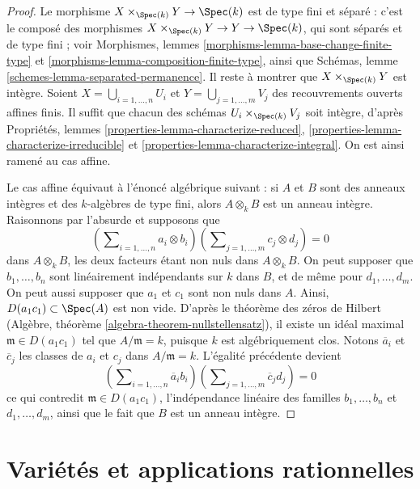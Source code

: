 \begin{proof}
Le morphisme $X \times_{\Spec(k)} Y \to \Spec(k)$ est de type
fini et séparé : c'est le composé des morphismes
$X \times_{\Spec(k)} Y \to Y \to \Spec(k)$, qui sont séparés
et de type fini ; voir Morphismes, lemmes
\ref{morphisms-lemma-base-change-finite-type} et
\ref{morphisms-lemma-composition-finite-type}, ainsi que
Schémas, lemme \ref{schemes-lemma-separated-permanence}.
Il reste à montrer que $X \times_{\Spec(k)} Y$ est intègre.
Soient $X = \bigcup_{i = 1, \ldots, n} U_i$ et
$Y = \bigcup_{j = 1, \ldots, m} V_j$ des recouvrements
ouverts affines finis. Il suffit que chacun des schémas
$U_i \times_{\Spec(k)} V_j$ soit intègre, d'après
Propriétés, lemmes \ref{properties-lemma-characterize-reduced},
\ref{properties-lemma-characterize-irreducible} et
\ref{properties-lemma-characterize-integral}.
On est ainsi ramené au cas affine.

\medskip\noindent
Le cas affine équivaut à l'énoncé algébrique suivant : si $A$ et
$B$ sont des anneaux intègres et des $k$-algèbres de type fini, alors $A
\otimes_k B$ est un anneau intègre. Raisonnons par l'absurde et supposons que
$$
(\sum\nolimits_{i = 1, \ldots, n} a_i \otimes b_i)
(\sum\nolimits_{j = 1, \ldots, m} c_j \otimes d_j) = 0
$$
dans $A \otimes_k B$, les deux facteurs étant non nuls dans $A
\otimes_k B$. On peut supposer que $b_1, \ldots, b_n$ sont
linéairement indépendants sur $k$ dans $B$, et de même pour
$d_1, \ldots, d_m$. On peut aussi supposer que $a_1$ et $c_1$
sont non nuls dans $A$. Ainsi, $D(a_1c_1) \subset \Spec(A)$ est
non vide. D'après le théorème des zéros de Hilbert
(Algèbre, théorème \ref{algebra-theorem-nullstellensatz}), il existe
un idéal maximal $\mathfrak m \in D(a_1c_1)$ tel que
$A/\mathfrak m = k$, puisque $k$ est algébriquement clos. Notons
$\overline{a}_i$ et $\overline{c}_j$ les classes de $a_i$ et $c_j$
dans $A/\mathfrak m = k$. L'égalité précédente devient
$$
(\sum\nolimits_{i = 1, \ldots, n} \overline{a}_i b_i)
(\sum\nolimits_{j = 1, \ldots, m} \overline{c}_j d_j) = 0
$$
ce qui contredit $\mathfrak m \in D(a_1c_1)$, l'indépendance linéaire
des familles $b_1, \ldots, b_n$ et $d_1, \ldots, d_m$, ainsi que
le fait que $B$ est un anneau intègre.
\end{proof}






\section{Variétés et applications rationnelles}
\label{section-varieties-rational-maps}

